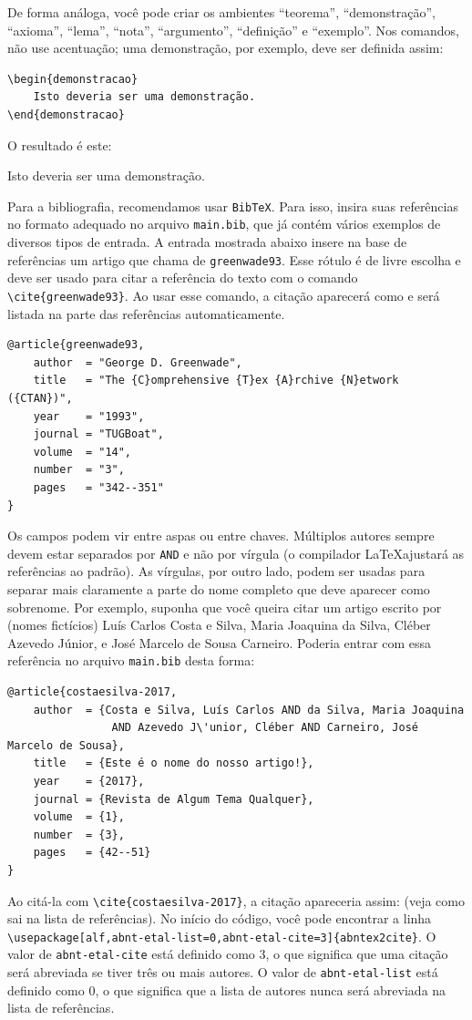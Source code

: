 \documentclass[12pt,a4paper,twoside]{article}
\begin{document}
De forma análoga, você pode criar os ambientes ``teorema'', ``demonstração'', ``axioma'', ``lema'', ``nota'', ``argumento'', ``definição'' e ``exemplo''. Nos comandos, não use acentuação; uma demonstração, por exemplo, deve ser definida assim:
\begin{verbatim}
\begin{demonstracao}
    Isto deveria ser uma demonstração.
\end{demonstracao}
\end{verbatim}
O resultado é este:
\begin{demonstracao}
    Isto deveria ser uma demonstração.
\end{demonstracao}

Para a bibliografia, recomendamos usar \verb|BibTeX|. Para isso, insira suas referências no formato adequado no arquivo \verb|main.bib|, que já contém vários exemplos de diversos tipos de entrada. A entrada mostrada abaixo insere na base de referências um artigo que chama de \verb|greenwade93|. Esse rótulo é de livre escolha e deve ser usado para citar a referência do texto com o comando \verb|\cite{greenwade93}|. Ao usar esse comando, a citação aparecerá como \cite{greenwade93} e será listada na parte das referências automaticamente.
\begin{verbatim}
@article{greenwade93,
    author  = "George D. Greenwade",
    title   = "The {C}omprehensive {T}ex {A}rchive {N}etwork ({CTAN})",
    year    = "1993",
    journal = "TUGBoat",
    volume  = "14",
    number  = "3",
    pages   = "342--351"
}
\end{verbatim}
Os campos podem vir entre aspas ou entre chaves. Múltiplos autores sempre devem estar separados por \verb|AND| e não por vírgula (o compilador \LaTeX ajustará as referências ao padrão). As vírgulas, por outro lado, podem ser usadas para separar mais claramente a parte do nome completo que deve aparecer como sobrenome. Por exemplo, suponha que você queira citar um artigo escrito por (nomes fictícios) Luís Carlos Costa e Silva, Maria Joaquina da Silva,  Cléber Azevedo Júnior, e José Marcelo de Sousa Carneiro. Poderia entrar com essa referência no arquivo \verb|main.bib| desta forma:
\begin{verbatim}
@article{costaesilva-2017,
    author  = {Costa e Silva, Luís Carlos AND da Silva, Maria Joaquina
                AND Azevedo J\'unior, Cléber AND Carneiro, José Marcelo de Sousa},
    title   = {Este é o nome do nosso artigo!},
    year    = {2017},
    journal = {Revista de Algum Tema Qualquer},
    volume  = {1},
    number  = {3},
    pages   = {42--51}
}
\end{verbatim}
Ao citá-la com \verb|\cite{costaesilva-2017}|, a citação apareceria assim: \cite{costaesilva-2017} (veja como sai na lista de referências).
No início do código, você pode encontrar a linha \verb|\usepackage[alf,abnt-etal-list=0,abnt-etal-cite=3]{abntex2cite}|.
O valor de \verb|abnt-etal-cite| está definido como $3$, o que significa que uma citação será abreviada se tiver três ou mais autores.
O valor de \verb|abnt-etal-list| está definido como $0$, o que significa que a lista de autores nunca será abreviada na lista de referências.
\end{document}
